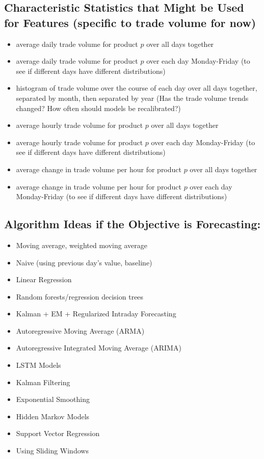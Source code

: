 \documentclass[11pt]{paper}
\begin{document}
\subsection{Characteristic Statistics that Might be Used for Features (specific to trade volume for now)}
\begin{itemize}
\setlength{\itemsep}{0pt}
  \setlength{\parskip}{0pt}
\item average daily trade volume for product $p$ over all days together
\item average daily trade volume for product $p$ over each day Monday-Friday (to see if different days have different distributions)
\item histogram of trade volume over the course of each day over all days together, separated by month, then separated by year (Has the trade volume trends changed? How often should models be recalibrated?)
\item average hourly trade volume for product $p$ over all days together
\item average hourly trade volume for product $p$ over each day Monday-Friday (to see if different days have different distributions)
\item average change in trade volume per hour for product $p$ over all days together
\item average change in trade volume per hour for product $p$ over each day Monday-Friday (to see if different days have different distributions)
\end{itemize}

\subsection{Algorithm Ideas if the Objective is Forecasting:}
\begin{itemize}
\setlength{\itemsep}{0pt}
  \setlength{\parskip}{0pt}
\item Moving average, weighted moving average
\item Naive (using previous day's value, baseline)
\item Linear Regression
\item Random forests/regression decision trees
\item Kalman + EM + Regularized Intraday Forecasting
\item Autoregressive Moving Average (ARMA)
\item Autoregressive Integrated Moving Average (ARIMA)
\item LSTM Models
\item Kalman Filtering
\item Exponential Smoothing
\item Hidden Markov Models
\item Support Vector Regression
\item Using Sliding Windows
\end{itemize}
\end{document}
